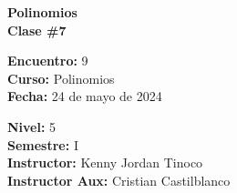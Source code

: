 \begin{center} \textbf
{
    \Large Polinomios \\ \vspace{2mm}Clase \#7
}
\end{center}

\begin{multicols}{2}
{
    \textbf{Encuentro:} 9\\
    \textbf{Curso:} Polinomios\\
    \textbf{Fecha:} 24 de mayo de 2024\\
    \begin{flushright}
        \textbf{Nivel:} 5\\
        \textbf{Semestre:} I\\
        \textbf{Instructor:} Kenny Jordan Tinoco\\
        \textbf{Instructor Aux:} Cristian Castilblanco
    \end{flushright}
}
\end{multicols}

\thispagestyle{first-page-style}